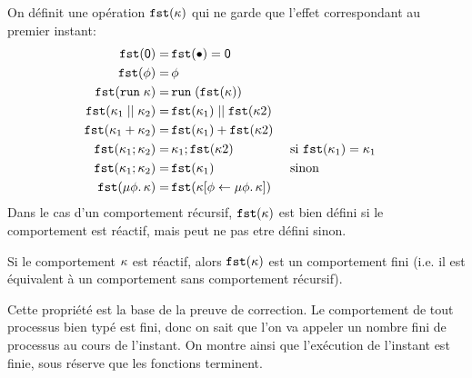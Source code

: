 \documentclass[9pt,preprint]{sigplanconf}
\begin{document}
On définit une opération $\mathtt{fst}(\kappa)$ qui ne garde que l'effet correspondant au premier instant:
\begin{align*}
\mathtt{fst}(\textsf{0}) =&\, \mathtt{fst}(\bullet)  = \textsf{0} \\
\mathtt{fst}(\phi) =&\, \phi \\
\mathtt{fst}(\mathtt{run}\; \kappa) =&\, \mathtt{run}\; (\mathtt{fst}(\kappa)) \\ 
\mathtt{fst}(\kappa_1 \mid\mid \kappa_2) =&\, \mathtt{fst}(\kappa_1) \mid\mid \mathtt{fst}(\kappa2) \\
\mathtt{fst}(\kappa_1 + \kappa_2) =&\, \mathtt{fst}(\kappa_1) + \mathtt{fst}(\kappa2) \\
\mathtt{fst}(\kappa_1 ; \kappa_2) =&\, \kappa_1 ; \mathtt{fst}(\kappa2) &&\text{ si } \mathtt{fst}(\kappa_1) = \kappa_1\\
\mathtt{fst}(\kappa_1 ; \kappa_2) =&\, \mathtt{fst}(\kappa_1) && \text{ sinon } \\
\mathtt{fst}(\mu \phi.\, \kappa) =&\, \mathtt{fst}(\kappa[\phi \leftarrow \mu \phi.\, \kappa])
\end{align*}
Dans le cas d'un comportement récursif, $\mathtt{fst}(\kappa)$ est bien défini si le comportement est réactif, mais peut ne pas etre défini sinon.

\begin{property}
Si le comportement $\kappa$ est réactif, alors $\mathtt{fst}(\kappa)$ est un comportement fini (i.e. il est équivalent à un comportement sans comportement récursif).
\end{property}
Cette propriété est la base de la preuve de correction. Le comportement de tout processus bien typé est fini, donc on sait que l'on va appeler un nombre fini de processus au cours de l'instant. On montre ainsi que l'exécution de l'instant est finie, sous réserve que les fonctions terminent.
\end{document}
